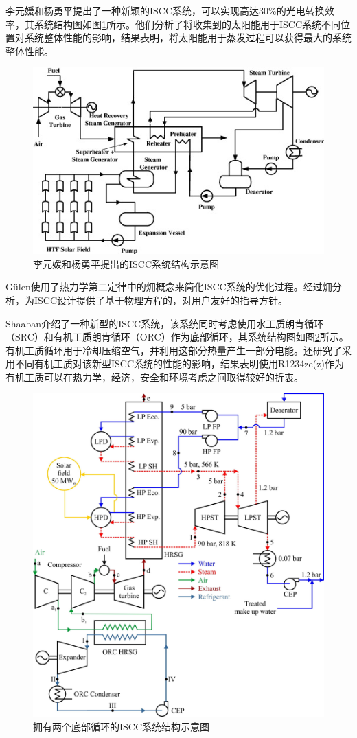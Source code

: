 李元媛和杨勇平\cite{Li2014}提出了一种新颖的ISCC系统，可以实现高达30\%的光电转换效率，其系统结构图如图\ref{fig:Li2014}所示。他们分析了将收集到的太阳能用于ISCC系统不同位置对系统整体性能的影响，结果表明，将太阳能用于蒸发过程可以获得最大的系统整体性能。
\begin{figure}[!ht]
\centering
\includegraphics[width=.8\textwidth]{fig/Li2014.jpg}
\caption{李元媛和杨勇平提出的ISCC系统结构示意图}
\label{fig:Li2014}
\end{figure}

G\"{u}len\cite{Gulen2015}使用了热力学第二定律中的㶲概念来简化ISCC系统的优化过程。经过㶲分析，为ISCC设计提供了基于物理方程的，对用户友好的指导方针。

Shaaban\cite{Shaaban2016}介绍了一种新型的ISCC系统，该系统同时考虑使用水工质朗肯循环（SRC）和有机工质朗肯循环（ORC）作为底部循环，其系统结构图如图\ref{fig:Shaaban2016}所示。有机工质循环用于冷却压缩空气，并利用这部分热量产生一部分电能。还研究了采用不同有机工质对该新型ISCC系统的性能的影响，结果表明使用R1234ze(z)作为有机工质可以在热力学，经济，安全和环境考虑之间取得较好的折衷。
\begin{figure}[!ht]
\centering
\includegraphics[width=.8\textwidth]{fig/Shaaban2016.jpg}
\caption{拥有两个底部循环的ISCC系统结构示意图}\label{fig:Shaaban2016}
\end{figure}

